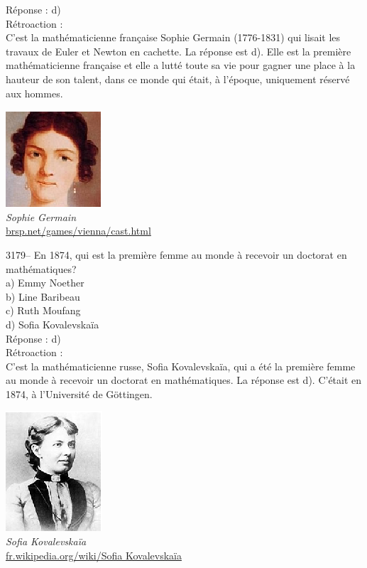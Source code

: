 \documentclass[letterpaper, 12pt]{article}
\begin{document}
R\'eponse : d)\\

R\'etroaction :\\
C'est la math\'ematicienne fran\c caise Sophie Germain (1776-1831) qui lisait les travaux de Euler et Newton en cachette. La r\'eponse est d). Elle est la premi\`ere math\'ematicienne fran\c caise et elle a lutt\'e toute sa vie pour gagner une place \`a la hauteur de son talent, dans ce monde qui \'etait, \`a l'\'epoque, uniquement r\'eserv\'e aux hommes.\\
\begin{center}
\includegraphics[scale=1.5]{Sophie_Germain.eps}\\
\emph{{\small Sophie Germain}}\\
\href{http://brsp.net/games/vienna/cast.html}{brsp.net/games/vienna/cast.html}\\[5mm]
\end{center}



3179-- En 1874, qui est la premi\`ere femme au monde \`a recevoir un doctorat en math\'ematiques?\\

a) Emmy Noether\\
b) Line Baribeau\\
c) Ruth Moufang\\
d) Sofia Kovalevska\"ia\\

R\'eponse : d)\\

R\'etroaction :\\
C'est la math\'ematicienne russe, Sofia Kovalevska\"ia, qui a \'et\'e la premi\`ere femme au monde \`a recevoir un doctorat en math\'ematiques. La r\'eponse est d). C'\'etait en 1874, \`a l'Universit\'e de G\"ottingen.\\
\begin{center}
\includegraphics[scale=1.5]{Kovalevskaia.eps}\\
\emph{{\small Sofia Kovalevska\"ia}}\\
\href{http://fr.wikipedia.org/wiki/Sofia_Kovalevska\%C3\%AFa}{fr.wikipedia.org/wiki/Sofia Kovalevska\"ia}\\[5mm]
\end{center}
\end{document}
